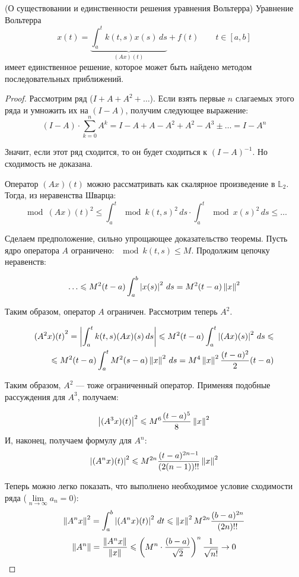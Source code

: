 \documentclass[12pt]{article}
\begin{document}
		\begin{theorem}
			(О существовании и единственности решения уравнения Вольтерра)
			Уравнение Вольтерра
			$$x(t) = \underbrace{\int_a^t k(t,s) x(s) \, ds}_{(Ax)(t)} + f(t) \qquad t\in [a,b]$$
			имеет единственное решение, которое может быть найдено методом последовательных приближений.
		\end{theorem}		
	
		\begin{proof}
			Рассмотрим ряд ($I + A + A^2 + \ldots$). Если взять первые $n$ слагаемых этого ряда и умножить их на $(I - A)$, 
			получим следующее выражение:
			$$(I-A) \cdot \sum_{k=0}^n A^k = I - A + A - A^2 + A^2 - A^3 \pm\ldots = I - A^n$$
		
			Значит, если этот ряд сходится, то он будет сходиться к $(I - A)^{-1}$. Но сходимость не доказана.
		
			Оператор $(Ax)(t)$ можно рассматривать как скалярное произведение в $\mathbb{L}_2$. Тогда, из неравенства Шварца:
			$$\mod{(Ax)(t)}^2 \leq 
			  \int_a^t \mod{k(t,s)}^2 \,ds \cdot \int_a^t \mod{x(s)}^2 \,ds \leq \ldots$$
			  
			Сделаем предположение, сильно упрощающее доказательство теоремы. Пусть ядро оператора $A$ 
			ограничено: $\mod{k(t,s)} \leq M$. Продолжим цепочку неравенств:
		
			$$\ldots \leqslant M^2(t-a) \int_a^b \left| x(s) \right|^2 \,ds = M^2(t-a)\left\| x \right\|^2$$
		
			Таким образом, оператор $A$ ограничен. Рассмотрим теперь $A^2$.
		
			\begin{align*}
				{(A^2x)(t)}^2 = \left| \int_a^t k(t,s)(Ax)(s) \,ds \right| \leqslant M^2(t-a)\int_a^t\left| (Ax)(s) \right|^2\,ds \leqslant \\ 
				\leqslant M^2(t-a)\int_a^tM^2(s-a)\left\| x \right\|^2 \,ds = M^4 \left\| x \right\|^2 \frac{(t-a)^2}{2}(t-a)
			\end{align*}
		
			Таким образом, $A^2$ --- тоже ограниченный оператор. Применяя подобные рассуждения для $A^3$, получаем:
		
			$$\left| (A^3x)(t) \right|^2 \leqslant M^6 \frac{(t-a)^5}{8}\left\| x \right\|^2 $$
			И, наконец, получаем формулу для $A^n$:
			$$\left| (A^nx)(t) \right|^2 \leqslant M^{2n} \frac{(t-a)^{2n-1}}{(2(n-1))!!}\left\| x \right\|^2 $$
		
			Теперь можно легко показать, что выполнено необходимое условие сходимости ряда 
			($\underset{n\rightarrow\infty}{\lim} a_n = 0$):
			$$\left\| A^nx \right\|^2 = \int_a^b \left| (A^nx)(t) \right|^2 \,dt \leqslant \left\| x \right\|^2 M^{2n} \frac{(b-a)^{2n}}{(2n)!!}$$
			$$\left\| A^n \right\| = \frac{\left\| A^nx \right\|}{\left\| x \right\|} \leqslant 
			  \left( M^n\cdot\frac{(b-a)}{\sqrt{2}}\right)^n \frac{1}{\sqrt{n!}} \rightarrow 0$$
			  

\end{proof}
\end{document}
